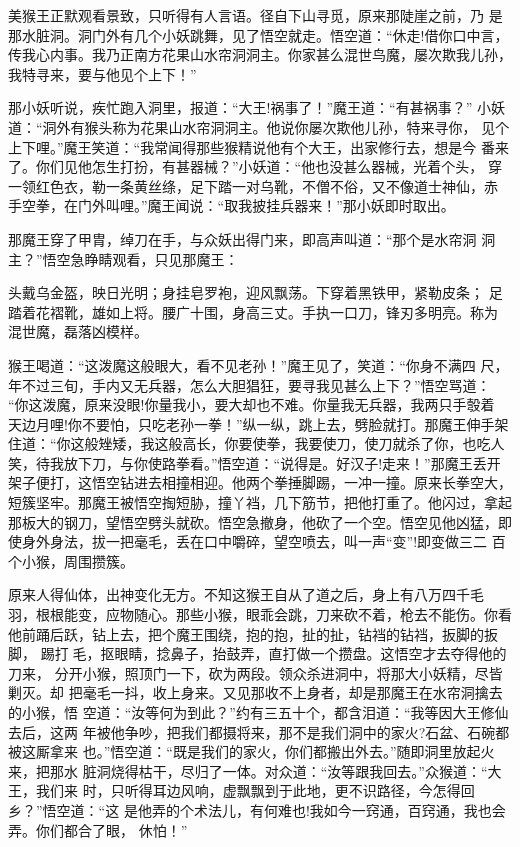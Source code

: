美猴王正默观看景致，只听得有人言语。径自下山寻觅，原来那陡崖之前，乃
是那水脏洞。洞门外有几个小妖跳舞，见了悟空就走。悟空道：“休走!借你口中言，
传我心内事。我乃正南方花果山水帘洞洞主。你家甚么混世鸟魔，屡次欺我儿孙，
我特寻来，要与他见个上下！”

那小妖听说，疾忙跑入洞里，报道：“大王!祸事了！”魔王道：“有甚祸事？”
小妖道：“洞外有猴头称为花果山水帘洞洞主。他说你屡次欺他儿孙，特来寻你，
见个上下哩。”魔王笑道：“我常闻得那些猴精说他有个大王，出家修行去，想是今
番来了。你们见他怎生打扮，有甚器械？”小妖道：“他也没甚么器械，光着个头，
穿一领红色衣，勒一条黄丝绦，足下踏一对乌靴，不僧不俗，又不像道士神仙，赤
手空拳，在门外叫哩。”魔王闻说：“取我披挂兵器来！”那小妖即时取出。

那魔王穿了甲胄，绰刀在手，与众妖出得门来，即高声叫道：“那个是水帘洞
洞主？”悟空急睁睛观看，只见那魔王：

头戴乌金盔，映日光明；身挂皂罗袍，迎风飘荡。下穿着黑铁甲，紧勒皮条；
足踏着花褶靴，雄如上将。腰广十围，身高三丈。手执一口刀，锋刃多明亮。称为
混世魔，磊落凶模样。

猴王喝道：“这泼魔这般眼大，看不见老孙！”魔王见了，笑道：“你身不满四
尺，年不过三旬，手内又无兵器，怎么大胆猖狂，要寻我见甚么上下？”悟空骂道：
“你这泼魔，原来没眼!你量我小，要大却也不难。你量我无兵器，我两只手彀着
天边月哩!你不要怕，只吃老孙一拳！”纵一纵，跳上去，劈脸就打。那魔王伸手架
住道：“你这般矬矮，我这般高长，你要使拳，我要使刀，使刀就杀了你，也吃人
笑，待我放下刀，与你使路拳看。”悟空道：“说得是。好汉子!走来！”那魔王丢开
架子便打，这悟空钻进去相撞相迎。他两个拳捶脚踢，一冲一撞。原来长拳空大，
短簇坚牢。那魔王被悟空掏短胁，撞丫裆，几下筋节，把他打重了。他闪过，拿起
那板大的钢刀，望悟空劈头就砍。悟空急撤身，他砍了一个空。悟空见他凶猛，即
使身外身法，拔一把毫毛，丢在口中嚼碎，望空喷去，叫一声“变”!即变做三二
百个小猴，周围攒簇。

原来人得仙体，出神变化无方。不知这猴王自从了道之后，身上有八万四千毛
羽，根根能变，应物随心。那些小猴，眼乖会跳，刀来砍不着，枪去不能伤。你看
他前踊后跃，钻上去，把个魔王围绕，抱的抱，扯的扯，钻裆的钻裆，扳脚的扳脚，
踢打毛，抠眼睛，捻鼻子，抬鼓弄，直打做一个攒盘。这悟空才去夺得他的刀来，
分开小猴，照顶门一下，砍为两段。领众杀进洞中，将那大小妖精，尽皆剿灭。却
把毫毛一抖，收上身来。又见那收不上身者，却是那魔王在水帘洞擒去的小猴，悟
空道：“汝等何为到此？”约有三五十个，都含泪道：“我等因大王修仙去后，这两
年被他争吵，把我们都摄将来，那不是我们洞中的家火?石盆、石碗都被这厮拿来
也。”悟空道：“既是我们的家火，你们都搬出外去。”随即洞里放起火来，把那水
脏洞烧得枯干，尽归了一体。对众道：“汝等跟我回去。”众猴道：“大王，我们来
时，只听得耳边风响，虚飘飘到于此地，更不识路径，今怎得回乡？”悟空道：“这
是他弄的个术法儿，有何难也!我如今一窍通，百窍通，我也会弄。你们都合了眼，
休怕！”

